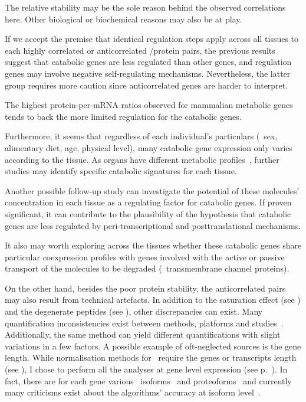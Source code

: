 The relative stability may be the sole reason behind the observed correlations here.
Other biological or biochemical reasons may also be at play.

If we accept the premise that
identical regulation steps apply across all tissues
to each highly correlated or anticorrelated \mRNA/protein pairs,
the previous results suggest that
catabolic genes are less regulated than other genes,
and
regulation genes may involve negative self-regulating mechanisms.
Nevertheless, the latter group requires more caution
since anticorrelated genes are harder to interpret.\mybr\

The highest protein-per-mRNA ratios observed
for mammalian metabolic genes~ tends
to back the more limited regulation for the catabolic genes.

Furthermore, it seems that regardless of each individual's particulars
(\eg\ sex, alimentary diet, age, physical level),
many catabolic gene expression only varies according to the tissue.
As organs have different metabolic profiles~,
further studies may identify specific catabolic signatures for each tissue.

Another possible follow-up study can investigate
the potential of these molecules' concentration in each tissue
as a regulating factor for catabolic genes.
If proven significant,
it can contribute to the plausibility of the hypothesis that
catabolic genes are less regulated
by peri-transcriptional and posttranslational mechanisms.

It also may worth exploring across the tissues
whether these catabolic genes share particular coexpression profiles
with genes involved with the active or passive transport of the molecules
to be degraded (\eg\ transmembrane channel proteins).

On the other hand,
besides the poor protein stability,
the anticorrelated pairs may also result from technical artefacts.
In addition to the saturation effect (see )
and the degenerate peptides (see ),
other discrepancies can exist.
Many quantification inconsistencies exist
between methods, platforms and studies~.
Additionally, the same method can yield different quantifications
with slight variations in a few factors.
A possible example of oft-neglected sources is the gene length.
While normalisation methods for \Rnaseq\ require the genes or transcripts length
(see ),
I chose to perform all the analyses at gene level expression
(see p.~\pageref{minisec:quantNorm}).
In fact, there are for each gene various \mRNA\ isoforms~
and proteoforms~
and currently many criticisms exist about
the algorithms' accuracy at isoform level~.\mybr\


